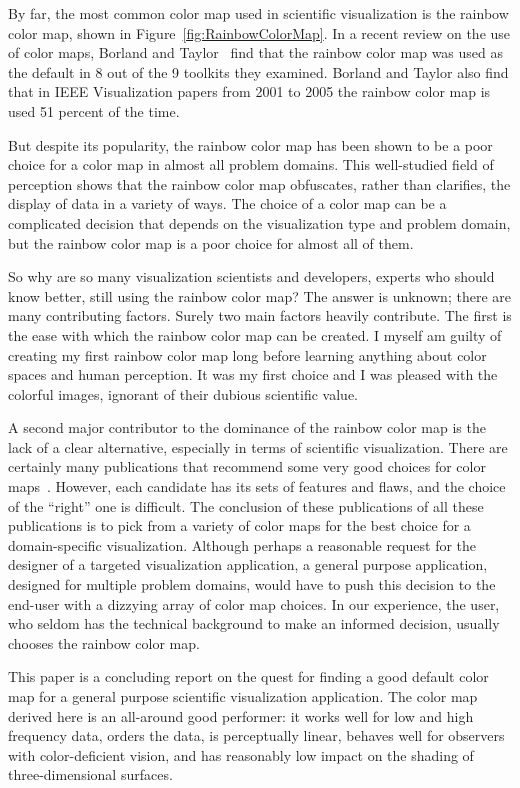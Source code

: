 \documentclass[twocolumn]{article}
\newcommand{\lcite}[1]{~\cite{#1}}
\newcommand{\scite}[1]{~\cite{#1}}
\begin{document}
By far, the most common color map used in scientific visualization is the
rainbow color map, shown in Figure~\ref{fig:RainbowColorMap}.  In a recent
review on the use of color maps, Borland and Taylor\scite{Borland07} find
that the rainbow color map was used as the default in 8 out of the 9
toolkits they examined.  Borland and Taylor also find that in IEEE
Visualization papers from 2001 to 2005 the rainbow color map is used 51
percent of the time.

But despite its popularity, the rainbow color map has been shown to be a
poor choice for a color map in almost all problem domains.  This
well-studied field of perception shows that the rainbow color map obfuscates,
rather than clarifies, the display of data in a variety of ways.  The
choice of a color map can be a complicated decision that depends on
the visualization type and problem domain, but the rainbow color map is a
poor choice for almost all of them.

So why are so many visualization scientists and developers, experts who
should know better, still using the rainbow color map?  The answer is
unknown; there are many contributing factors.  Surely two main factors
heavily contribute.  The first is the ease with which the rainbow color map
can be created.  I myself am guilty of creating my first rainbow color map
long before learning anything about color spaces and human perception.  It
was my first choice and I was pleased with the colorful images, ignorant of
their dubious scientific value.

A second major contributor to the dominance of the rainbow color map is the
lack of a clear alternative, especially in terms of scientific
visualization.  There are certainly many publications that recommend some
very good choices for color maps\lcite{Rheingans99,Ware04,Brewer05}.
However, each candidate has its sets of features and flaws, and the choice of
the ``right'' one is difficult.  The conclusion of these publications of
all these publications is to pick from a variety of color maps for the best
choice for a domain-specific visualization.  Although perhaps a reasonable
request for the designer of a targeted visualization application, a general
purpose application, designed for multiple problem domains, would have to
push this decision to the end-user with a dizzying array of color map
choices.  In our experience, the user, who seldom has the technical
background to make an informed decision, usually chooses the rainbow color
map.

This paper is a concluding report on the quest for finding a good default
color map for a general purpose scientific visualization application.  The
color map derived here is an all-around good performer: it works well for
low and high frequency data, orders the data, is perceptually linear,
behaves well for observers with color-deficient vision, and has reasonably
low impact on the shading of three-dimensional surfaces.
\end{document}
